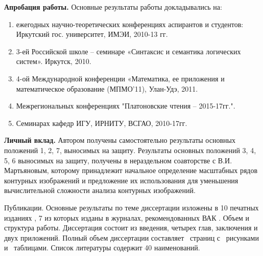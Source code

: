 \noindent
\textbf{Апробация работы.} Основные результаты работы докладывались на: 
\begin{enumerate}
\item ежегодных научно-теоретических конференциях аспирантов и студентов:  Иркутский  гос. университет, ИМЭИ, 2010-13 гг.
\item 3-ей Российской школе – семинаре «Синтаксис и семантика логических систем». Иркутск, 2010.
\item 4-ой Международной конференции «Математика, ее приложения и математическое   
    образование (МПМО’11),  Улан-Удэ, 2011.
\item Межрегиональных конференциях "Платоновские чтения – 2015-17гг.".
\item Семинарах кафедр ИГУ, ИРНИТУ, ВСГАО, 2010-17гг.
\end{enumerate}

\textbf{Личный вклад.} Автором получены самостоятельно результаты основных положений 1, 2, 7,  выносимых  на защиту.  Результаты основных положений 3, 4, 5, 6  выносимых  на защиту, получены в нераздельном соавторстве с В.И. Мартьяновым, которому принадлежит начальное определение масштабных рядов контурных изображений и предложение их использования для уменьшения вычислительной сложности анализа контурных изображений.

Публикации. Основные результаты по теме диссертации изложены в 10 печатных
изданиях \cite{D5,D6,D7,D8, D15,D16,D18,D19,D20,scaleline,overlaps}, 7 из которых изданы в журналах, рекомендованных ВАК \cite{D6,D7,D8, D15,D19,D20,scaleline,overlaps}.
Объем и структура работы. Диссертация состоит из введения, четырех глав, заключения и двух приложений. Полный объем диссертации составляет \pageref{LastPage}\ страниц с \totalfigures\ рисунками и \totaltables\ таблицами. Список литературы содержит 40 наименований.